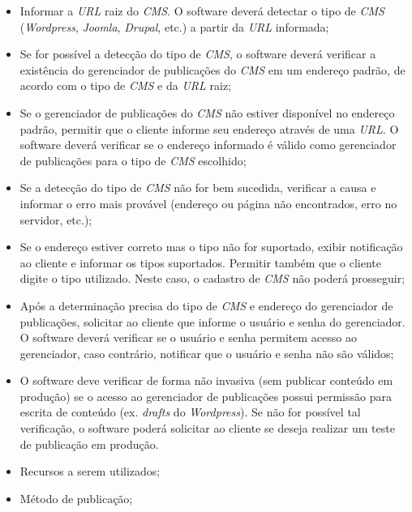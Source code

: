 \documentclass[a4paper,12pt]{article}
\def\cms{\emph{CMS}}
\begin{document}
\begin{itemize}
\item Informar a \emph{URL} raiz do \cms{}. O software deverá detectar o tipo de \cms{} (\emph{Wordpress}, \emph{Joomla}, \emph{Drupal}, etc.) a partir da \emph{URL} informada;
\item Se for possível a detecção do tipo de \cms{}, o software deverá verificar a existência do gerenciador de publicações do \cms{} em um endereço padrão, de acordo com o tipo de \cms{} e da \emph{URL} raiz;
\item Se o gerenciador de publicações do \cms{} não estiver disponível no endereço padrão, permitir que o cliente informe seu endereço através de uma \emph{URL}. O software deverá verificar se o endereço informado é válido como gerenciador de publicações para o tipo de \cms{} escolhido;
\item Se a detecção do tipo de \cms{} não for bem sucedida, verificar a causa e informar o erro mais provável (endereço ou página não encontrados, erro no servidor, etc.);
\item Se o endereço estiver correto mas o tipo não for suportado, exibir notificação ao cliente e informar os tipos suportados. Permitir também que o cliente digite o tipo utilizado. Neste caso, o cadastro de \cms{} não poderá prosseguir;
\item Após a determinação precisa do tipo de \cms{} e endereço do gerenciador de publicações, solicitar ao cliente que informe o usuário e senha do gerenciador. O software deverá verificar se o usuário e senha permitem acesso ao gerenciador, caso contrário, notificar que o usuário e senha não são válidos;
\item O software deve verificar de forma não invasiva (sem publicar conteúdo em produção) se o acesso ao gerenciador de publicações possui permissão para escrita de conteúdo (ex. \emph{drafts} do \emph{Wordpress}). Se não for possível tal verificação, o software poderá solicitar ao cliente se deseja realizar um teste de publicação em produção.
\item Recursos a serem utilizados;
\item Método de publicação;
\end{itemize}
\end{document}
